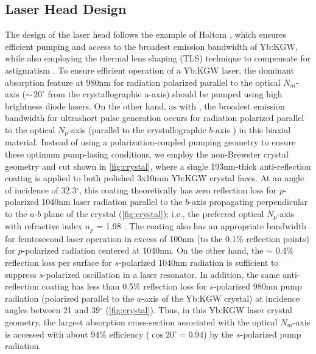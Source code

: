 \subsection{Laser Head Design}

The design of the laser head follows the example of Holtom \cite{Holtom_mode_locked_2006}, which ensures efficient pumping and access to the broadest emission bandwidth of Yb:KGW, while also employing the thermal lens shaping (TLS) technique to compensate for astigmatism \cite{Rimington_thermal_lens_2004}.
To ensure efficient operation of a Yb:KGW laser, the dominant absorption feature at 980nm for radiation polarized parallel to the optical $N_m$-axis ($\sim\,20^\circ$ from the crystallographic a-axis) should be pumped using high brightness diode lasers.
On the other hand, as with  \cite{Liu_diode_pumped_2001,Killi_high_peak_2005}, the broadest emission bandwidth for ultrashort pulse generation occurs for radiation polarized parallel to the optical $N_p$-axis (parallel to the crystallographic $b$-axis \cite{Holtom_mode_locked_2006}) in this biaxial material. 
Instead of using a polarization-coupled pumping geometry \cite{Holtom_mode_locked_2006} to ensure these optimum pump-lasing conditions, we employ the non-Brewster crystal geometry and cut shown in \ref{fig:crystal}, where a single 193nm-thick  anti-reflection coating is applied to both polished 3x10mm Yb:KGW crystal faces.
At an angle of incidence of 32.3$^\circ$, this coating theoretically has zero reflection loss for $p$-polarized 1040nm laser radiation parallel to the $b$-axis propagating perpendicular to the $a$-$b$ plane of the crystal (\ref{fig:crystal}); i.e., the preferred optical $N_p$-axis with refractive index $n_p$ = 1.98 \cite{Biswal_thermo_optical_05,pujol_crystalline_1999}.
The  coating also has an appropriate bandwidth for femtosecond laser operation in excess of 100nm (to the
0.1\% reflection points) for $p$-polarized radiation centered at 1040nm.
On the other hand, the $\sim$ 0.4\% reflection loss per surface for $s$-polarized 1040nm radiation is sufficient to suppress $s$-polarized oscillation in a laser resonator.
In addition, the same anti-reflection coating has less than 0.5\% reflection loss for $s$-polarized 980nm pump radiation (polarized parallel to the $a$-axis of the Yb:KGW crystal) at incidence angles between 21 and 39$^\circ$ (\ref{fig:crystal}).
Thus, in this Yb:KGW laser crystal geometry, the largest absorption cross-section associated with the optical $N_m$-axis is accessed with about 94\% efficiency ($\cos 20^\circ = 0.94$) by the $s$-polarized pump radiation.

